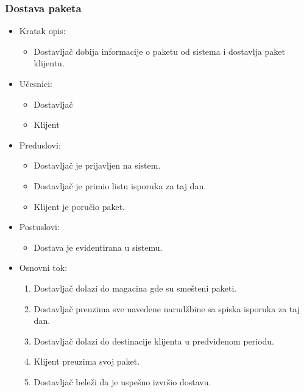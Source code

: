 
\subsubsection{Dostava paketa}

	\begin{itemize}
		\item{Kratak opis:} 
		\begin{itemize}
			\item{Dostavljač dobija informacije o paketu od sistema i dostavlja paket klijentu.}
		\end{itemize}
		
		\item{Učesnici:} 
		\begin{itemize}
			\item{Dostavljač}
			\item{Klijent}
		\end{itemize}		
		
		\item{Preduslovi:}
		\begin{itemize}
			\item{Dostavljač je prijavljen na sistem.}
			\item{Dostavljač je primio listu isporuka za taj dan.}
			\item{Klijent je poručio paket.}
		\end{itemize}		

		\item{Postuslovi:}
		\begin{itemize}
			\item{Dostava je evidentirana u sistemu.}
		\end{itemize}		
		
		\item{Osnovni tok:}
		\begin{enumerate}
			\item{Dostavljač dolazi do magacina gde su smešteni paketi.}
			\item{Dostavljač preuzima sve navedene narudžbine sa spiska isporuka za taj dan.}
			\item{Dostavljač dolazi do destinacije klijenta u predviđenom periodu.}
			\item{Klijent preuzima svoj paket.}
			\item{Dostavljač beleži da je uspešno izvršio dostavu.}
			
		\end{enumerate}
		

\end{itemize}
